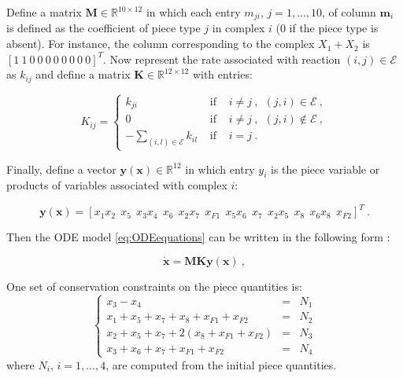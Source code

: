         Define a matrix $\mathbf{M} \in \mathbb{R}^{10 \times 12}$ in which
        each entry $m_{ji}$, $j=1,...,10$, of column $\mathbf{m}_i$ is
        defined as the coefficient of piece type $j$ in complex $i$ ($0$ if
        the piece type is absent).  For instance, the column corresponding
        to the complex $X_1 + X_2$ is $[1~1~0~0~0~0~0~0~0~0]^T$.  Now
        represent the rate associated with reaction $(i,j) \in \mathcal{E}$
        as $k_{ij}$ and define a matrix $\mathbf{K} \in \mathbb{R}^{12
        \times 12}$ with entries:

        \begin{equation}
            K_{ij} =  \left\{
                \begin{array}{lll}
                    k_{ji} &\mbox{ if }& i \neq j~, ~~(j,i) \in \mathcal{E}~, \\
                    0 &\mbox{ if }& i \neq j~, ~~(j,i) \notin \mathcal{E}~,\\
                    -\sum_{(i,l)\in {\mathcal E}} k_{il} &\mbox{ if }& i=j~.
                \end{array} \right. \label{eq:Kdef}
        \end{equation}

        Finally, define a vector $\mathbf{y(x)} \in \mathbb{R}^{12}$ in
        which entry $y_i$ is the piece variable or products of variables
        associated with complex $i$:

        \begin{equation} \mathbf{y(x)} = [x_1
            x_2~~x_5 ~~x_3 x_4 ~~x_6 ~~x_2 x_7 ~~x_{F1}~~x_5 x_6~~ x_7~~x_2 x_5
            ~~x_8~~ x_6 x_8 ~~x_{F2}]^T~. \label{eq:ydef1}
        \end{equation}

        Then the ODE model \eqref{eq:ODEequations} can be written in the
        following form \cite{Chaves:2004p11839}:

        \begin{equation}
            \mathbf{\dot{x}} = \mathbf{M}\mathbf{K}\mathbf{y}(\mathbf{x})~,
            \label{eq:matrixODE}
        \end{equation}

        One set of conservation constraints on the piece quantities is:
        \begin{equation}
            \left\lbrace
                \begin{array}{lll}
                    x_3 - x_4 &=& N_1 \\
                    x_1+x_5+x_7+x_8+x_{F1}+x_{F2} &=& N_2 \\
                    x_2+x_5+x_7+2(x_8+x_{F1}+x_{F2}) &=& N_3 \\
                    x_3+x_6+x_7+x_{F1}+x_{F2} &=& N_4
                \end{array}
            \right.
            \label{eq:cons}
        \end{equation}
        where $N_i$, $i=1,...,4$, are computed from the initial piece
        quantities.

